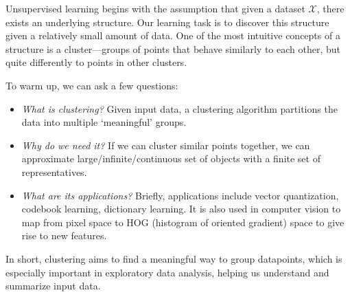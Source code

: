 %
%
%
%

Unsupervised learning begins with the assumption that given a dataset
$\mathcal{X}$, there exists an underlying structure. Our learning task
is to discover this structure given a relatively small amount of data.
One of the most intuitive concepts of a structure is a
cluster---groups of points that behave similarly to each other, but
quite differently to points in other clusters.

To warm up, we can ask a few questions:
\begin{itemize}
\item \emph{What is clustering?} Given input
  data, a clustering algorithm partitions the data into multiple
  `meaningful' groups. 
\item \emph{Why do we need it?} If we can cluster similar points
  together, we can approximate large/infinite/continuous set of
  objects with a finite set of representatives.
\item \emph{What are its applications?} Briefly, applications include
  vector quantization, codebook learning, dictionary learning. It is
  also used in computer vision to map from pixel space to HOG
  (histogram of oriented gradient) space to give rise to new
  features.
\end{itemize}
In short, clustering aims to find a meaningful way to group
datapoints, which is especially important in exploratory data
analysis, helping us understand and summarize input data.


